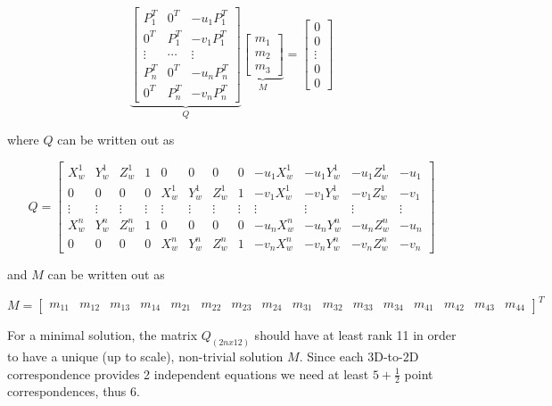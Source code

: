 \documentclass[10pt,a4paper]{scrartcl}
\begin{document}
\begin{multicols*}{2}
\begin{equation*}
\underbrace{
\begin{bmatrix}
P_1^T&0^T&-u_1P_1^T\\
0^T&P_1^T&-v_1P_1^T\\
\vdots&\cdots&\vdots\\
P_n^T&0^T&-u_nP_n^T\\
0^T&P_n^T&-v_nP_n^T
\end{bmatrix}}_Q
\underbrace{\begin{bmatrix}
m_1\\m_2\\m_3
\end{bmatrix}}_M=
\begin{bmatrix}
0\\0\\\vdots\\0\\0
\end{bmatrix}
\end{equation*}

where $Q$ can be written out as

\setcounter{MaxMatrixCols}{20}
\begin{equation*}
Q=\begin{bmatrix}
X_w^1&Y_w^1&Z_w^1&1&0&0&0&0&-u_1X_w^1&-u_1Y_w^1&-u_1Z_w^1&-u_1\\
0&0&0&0&X_w^1&Y_w^1&Z_w^1&1&-v_1X_w^1&-v_1Y_w^1&-v_1Z_w^1&-v_1\\
\vdots&\vdots&\vdots&\vdots&\vdots&\vdots&\vdots&\vdots&\vdots&\vdots&\vdots&\vdots\\
X_w^n&Y_w^n&Z_w^n&1&0&0&0&0&-u_nX_w^n&-u_nY_w^n&-u_nZ_w^n&-u_n\\
0&0&0&0&X_w^n&Y_w^n&Z_w^n&1&-v_nX_w^n&-v_nY_w^n&-v_nZ_w^n&-v_n
\end{bmatrix}
\end{equation*}

and $M$ can be written out as

\begin{tiny}
\begin{equation*}
M=\begin{bmatrix}
m_{11}&m_{12}&m_{13}&m_{14}&
m_{21}&m_{22}&m_{23}&m_{24}&
m_{31}&m_{32}&m_{33}&m_{34}&
m_{41}&m_{42}&m_{43}&m_{44}
\end{bmatrix}^T
\end{equation*}
\end{tiny}

For a minimal solution, the matrix $Q_{(2nx12)}$ should have at least rank 11 in order to have a unique (up to scale), non-trivial solution $M$. Since each 3D-to-2D correspondence provides 2 independent equations we need at least $5+\frac{1}{2}$ point correspondences, thus $6$.


\end{multicols*}
\end{document}
